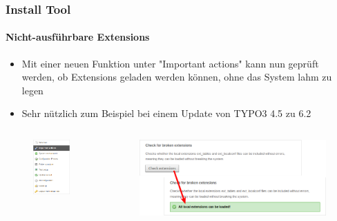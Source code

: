 \begin{frame}[fragile]
	\frametitle{Install Tool}
	\framesubtitle{Nicht-ausführbare Extensions}

	\begin{itemize}
		\item Mit einer neuen Funktion unter "Important actions" kann nun geprüft werden, ob Extensions geladen werden können, ohne das System lahm zu legen
		\item Sehr nützlich zum Beispiel bei einem Update von TYPO3 4.5 zu 6.2
	\end{itemize}

	\begin{columns}[T]
		\begin{column}{.3\textwidth}
			\begin{figure}\vspace*{-0.4cm}
				\includegraphics[width=0.7\linewidth]{Images/InstallTool/ImportantActions.png}
			\end{figure}
		\end{column}
		\begin{column}{.7\textwidth}
			\begin{figure}\vspace*{-0.4cm}
				\includegraphics[width=1\linewidth]{Images/InstallTool/CheckForBrokenExtensions.png}
			\end{figure}
		\end{column}
	\end{columns}


\end{frame}
